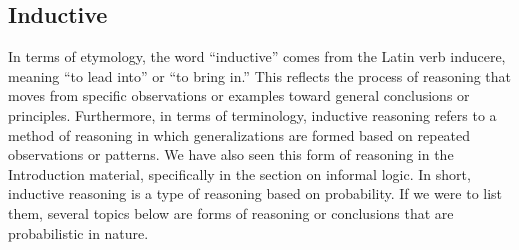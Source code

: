 \documentclass[12pt,a4paper,openany]{article}
\begin{document}
\subsection{Inductive}\label{inductive}

In terms of etymology, the word ``inductive'' comes from the Latin verb
inducere, meaning ``to lead into'' or ``to bring in.'' This reflects the
process of reasoning that moves from specific observations or examples
toward general conclusions or principles. Furthermore, in terms of
terminology, inductive reasoning refers to a method of reasoning in
which generalizations are formed based on repeated observations or
patterns. We have also seen this form of reasoning in the Introduction
material, specifically in the section on informal logic. In short,
inductive reasoning is a type of reasoning based on probability. If we
were to list them, several topics below are forms of reasoning or
conclusions that are probabilistic in nature.
\end{document}
